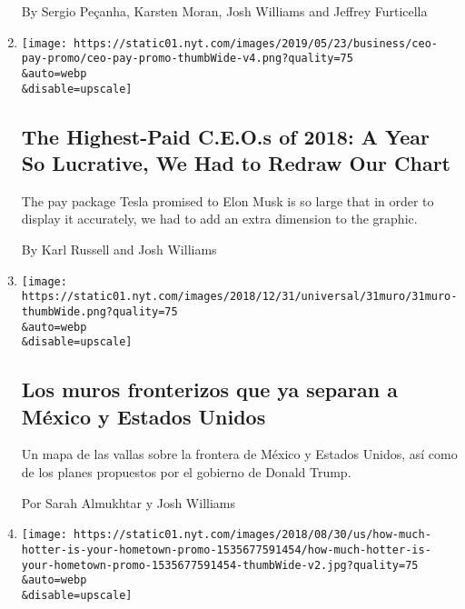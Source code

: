 \begin{enumerate}
  By Sergio Peçanha, Karsten Moran, Josh Williams and Jeffrey Furticella
\item
  \href{/interactive/2019/business/highest-paid-ceos-2018.html}{}

  \texttt{[image: https://static01.nyt.com/images/2019/05/23/business/ceo-pay-promo/ceo-pay-promo-thumbWide-v4.png?quality=75\\\&auto=webp\\\&disable=upscale]}

  \hypertarget{the-highest-paid-ceos-of-2018-a-year-so-lucrative-we-had-to-redraw-our-chart}{%
  \subsection{The Highest-Paid C.E.O.s of 2018: A Year So Lucrative, We
  Had to Redraw Our
  Chart}\label{the-highest-paid-ceos-of-2018-a-year-so-lucrative-we-had-to-redraw-our-chart}}

  The pay package Tesla promised to Elon Musk is so large that in order
  to display it accurately, we had to add an extra dimension to the
  graphic.

  By Karl Russell and Josh Williams
\item
  \href{/es/interactive/2018/12/27/universal/muro-fronterizo-mexico-estados-unidos.html}{}

  \texttt{[image: https://static01.nyt.com/images/2018/12/31/universal/31muro/31muro-thumbWide.png?quality=75\\\&auto=webp\\\&disable=upscale]}

  \hypertarget{los-muros-fronterizos-que-ya-separan-a-muxe9xico-y-estados-unidos}{%
  \subsection{Los muros fronterizos que ya separan a México y Estados
  Unidos}\label{los-muros-fronterizos-que-ya-separan-a-muxe9xico-y-estados-unidos}}

  Un mapa de las vallas sobre la frontera de México y Estados Unidos,
  así como de los planes propuestos por el gobierno de Donald Trump.

  Por Sarah Almukhtar y Josh Williams
\item
  \href{/interactive/2018/08/30/climate/how-much-hotter-is-your-hometown.html}{}

  \texttt{[image: https://static01.nyt.com/images/2018/08/30/us/how-much-hotter-is-your-hometown-promo-1535677591454/how-much-hotter-is-your-hometown-promo-1535677591454-thumbWide-v2.jpg?quality=75\\\&auto=webp\\\&disable=upscale]}

  \hypertarget{how-much-hotter-is-your-hometown-than-when-you-were-born}{%
}
\end{enumerate}
